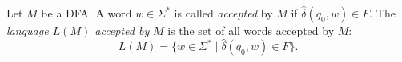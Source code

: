 

\setcounter{section}{1}
\setcounter{subsection}{2}
\setcounter{dfn}{1}

\begin{dfn}
Let $M$ be a DFA.
A word $w \in \Sigma^*$ is called \emph{accepted} by $M$ if $\widehat{\delta}(q_0, w) \in F$.
The \emph{language $L(M)$ accepted by} $M$ is the set of all words accepted by $M$:
\[
L(M) = \{w \in \Sigma^* \mid \widehat{\delta}(q_0,w) \in F\}.
\]
\end{dfn}


